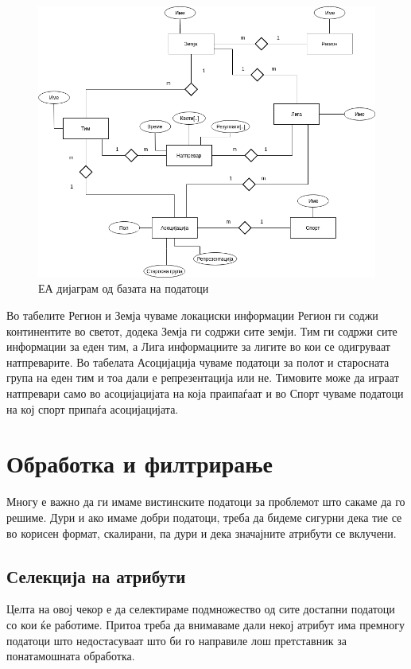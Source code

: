 \begin{figure}[hbtp]
\centering
\includegraphics[scale=0.4]{images/EA-diagram.png}
\caption{ЕА дијаграм од базата на податоци}
\label{fig:eadiagram}
\end{figure}

Во табелите Регион и Земја чуваме локациски информации Регион ги соджи континентите во светот, додека Земја ги содржи сите земји. Тим ги содржи сите информации за еден тим, а Лига информациите за лигите во кои се одигруваат натпреварите. Во табелата Асоцијација чуваме податоци за полот и старосната група на еден тим и тоа дали е репрезентација или не. Тимовите може да играат натпревари само во асоцијацијата на која праипаѓаат и во Спорт чуваме податоци на кој спорт припаѓа асоцијацијата.

\section{Обработка и филтрирање}
Многу е важно да ги имаме вистинските податоци за проблемот што сакаме да го решиме. Дури и ако имаме добри податоци, треба да бидеме сигурни дека тие се во корисен формат, скалирани, па дури и дека значајните атрибути се вклучени.
\subsection{Селекција на атрибути}
Целта на овој чекор е да селектираме подмножество од сите достапни податоци со кои ќе работиме. Притоа треба да внимаваме дали некој атрибут има премногу податоци што недостасуваат што би го направиле лош претставник за понатамошната обработка.

